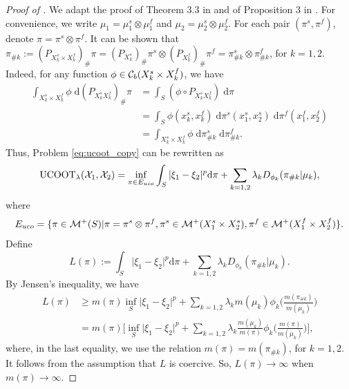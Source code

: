 \begin{proof}[Proof of ]
  We adapt the proof of Theorem 3.3 in \citep{Liero18} and of Proposition 3 in \citep{Sejourne20}.
  For convenience, we write $\mu_1 = \mu_1^s \otimes \mu_1^f$ and
  $\mu_2 = \mu_2^s \otimes \mu_2^f$. For each pair $(\pi^s, \pi^f)$, denote
  $\pi = \pi^s \otimes \pi^f$.
  It can be shown that
  $\pi_{\# k} := (P_{X_k^s \times X_k^f})_{\#} \pi
  = (P_{X_k^s})_{\#} \pi^s \otimes (P_{X_k^f})_{\#} \pi^f =
  \pi^s_{\# k} \otimes \pi^f_{\# k}$, for $k=1,2$. Indeed, for any function
  $\phi \in \mathcal C_b(X_k^s \times X_k^f)$, we have
    \begin{equation}
      \begin{split}
        \int_{X_k^s \times X_k^f} \phi \;
        \mathrm d (P_{X_k^s X_k^f})_{\#} \pi
        &= \int_{S} (\phi \circ P_{X_k^s X_k^f}) \; \mathrm d\pi \\
        &= \int_{S} \phi(x_k^s, x_k^f)
        \; \mathrm d \pi^s(x_1^s, x_2^s) \; \mathrm d \pi^f(x_1^f, x_2^f) \\
        &= \int_{X_k^s \times X_k^f} \phi \; \mathrm d \pi^s_{\# k} \;
        \mathrm d \pi^f_{\# k}.
      \end{split}
    \end{equation}
  Thus, Problem \eqref{eq:ucoot_copy} can be rewritten as
  \begin{equation}
    \text{UCOOT}_{\lambda}(\mathcal X_1, \mathcal X_2) =
    \inf_{\pi \in E_{uco}} \int_{S} \vert \xi_1 - \xi_2 \vert^p
    \mathrm d\pi + \sum_{k=1,2} \lambda_k D_{\phi_k}(\pi_{\# k} \vert \mu_k),
  \end{equation}
  where
  \begin{equation}
    E_{uco} = \{ \pi \in \mathcal M^+(S) \vert \pi = \pi^s \otimes \pi^f,
    \pi^s \in \mathcal M^+(X_1^s \times X_2^s),
    \pi^f \in \mathcal M^+(X_1^f \times X_2^f) \}.
  \end{equation}
  Define
  \begin{equation}
    L(\pi):= \int_{S} \vert \xi_1 - \xi_2 \vert^p \mathrm d \pi +
    \sum_{k=1,2} \lambda_k D_{\phi_k}(\pi_{\# k} \vert \mu_k).
  \end{equation}
  By Jensen's inequality, we have
  \begin{equation}
    \begin{split}
      L(\pi) &\geq m(\pi) \inf_{S} \vert \xi_1 - \xi_2 \vert^p +
      \sum_{k=1,2} \lambda_k m(\mu_k) \phi_k \Big( \frac{m(\pi_{\# k})}{m(\mu_k)} \Big) \\
      &= m(\pi) \bigg[ \inf_{S} \vert \xi_1 - \xi_2 \vert^p +
      \sum_{k=1,2} \lambda_k \frac{m(\mu_k)}{m(\pi)} \phi_k
      \Big( \frac{m(\pi)}{m(\mu_k)} \Big) \bigg],
    \end{split}
  \end{equation}
  where, in the last equality, we use the relation $m(\pi) = m(\pi_{\# k})$, for $k=1,2$.
  It follows from the assumption that $L$ is coercive. So, $L(\pi) \to \infty$
  when $m(\pi) \to \infty$.


\end{proof}
